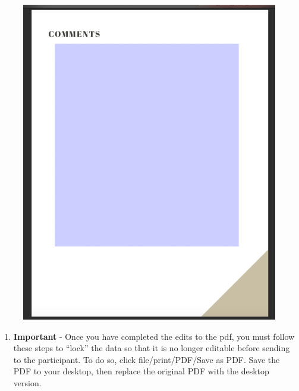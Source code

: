 \documentclass[]{book}
\providecommand{\tightlist}{%
  \setlength{\itemsep}{0pt}\setlength{\parskip}{0pt}}
\begin{document}
\begin{figure}
\centering
\includegraphics{images/final_checklist/report_cards/6.png}
\caption{}
\end{figure}

\begin{enumerate}
\def\labelenumi{\arabic{enumi}.}
\setcounter{enumi}{6}
\tightlist
\item
  \textbf{Important} - Once you have completed the edits to the pdf, you must follow these steps to ``lock'' the data so that it is no longer editable before sending to the participant. To do so, click file/print/PDF/Save as PDF. Save the PDF to your desktop, then replace the original PDF with the desktop version.
\end{enumerate}
\end{document}
